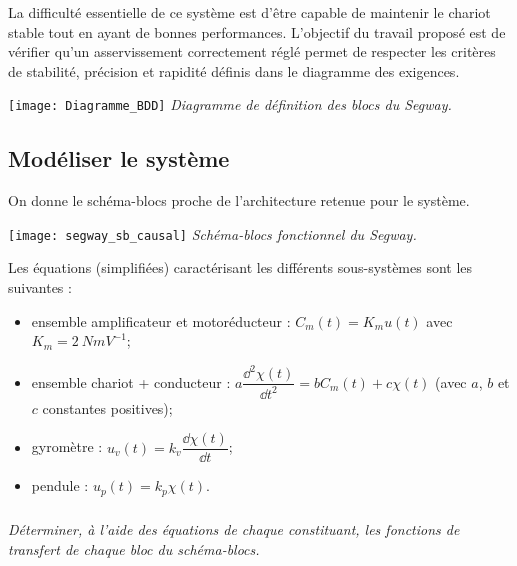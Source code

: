 \begin{multicols}{2}
\begin{obj}
La difficulté essentielle de ce système est d'être capable de maintenir le chariot stable tout en ayant de bonnes performances. L'objectif du travail proposé est de vérifier qu'un asservissement correctement réglé permet de respecter les critères de stabilité, précision et rapidité définis dans le diagramme des exigences.
\end{obj}


\begin{center}%
\texttt{[image: Diagramme\_BDD]}
\textit{Diagramme de définition des blocs du Segway\textregistered.}
\label{ex_Segway_BDD}
\end{center}%



\subsection*{Modéliser le système}

On donne le schéma-blocs proche de l'architecture retenue pour le système.%

\begin{center}%
\texttt{[image: segway\_sb\_causal]}
\textit{Schéma-blocs fonctionnel du Segway\textregistered.}
\label{segway_sb1}
\end{center}%

Les équations (simplifiées) caractérisant les différents sous-systèmes sont les suivantes :
\begin{itemize}
\item ensemble amplificateur et motoréducteur :  $C_m(t)=K_m u(t)$ avec $K_m=\SI{2}{Nm V^{-1}}$;
\item ensemble chariot + conducteur :  $a\dfrac{\dd^2 \chi(t)}{\dd t^2}=bC_m(t)+c \chi(t)$ (avec $a$, $b$ et $c$ constantes positives); 
\item gyromètre :  $u_v(t)=k_v \dfrac{\dd\chi(t)}{\dd t}$;
\item pendule :  $u_p(t)=k_p \chi(t)$.
\end{itemize}



\subparagraph{}\textit{Déterminer, à l'aide des équations de chaque constituant, les fonctions de transfert de chaque bloc du schéma-blocs.}%


\end{multicols}
